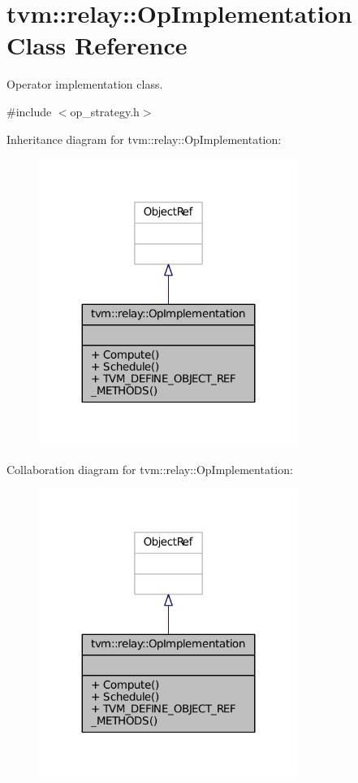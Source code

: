 \hypertarget{classtvm_1_1relay_1_1OpImplementation}{}\section{tvm\+:\+:relay\+:\+:Op\+Implementation Class Reference}
\label{classtvm_1_1relay_1_1OpImplementation}


Operator implementation class.  




{\ttfamily \#include $<$op\+\_\+strategy.\+h$>$}



Inheritance diagram for tvm\+:\+:relay\+:\+:Op\+Implementation\+:
\nopagebreak
\begin{figure}[H]
\begin{center}
\leavevmode
\includegraphics[width=239pt]{classtvm_1_1relay_1_1OpImplementation__inherit__graph}
\end{center}
\end{figure}


Collaboration diagram for tvm\+:\+:relay\+:\+:Op\+Implementation\+:
\nopagebreak
\begin{figure}[H]
\begin{center}
\leavevmode
\includegraphics[width=239pt]{classtvm_1_1relay_1_1OpImplementation__coll__graph}
\end{center}
\end{figure}
